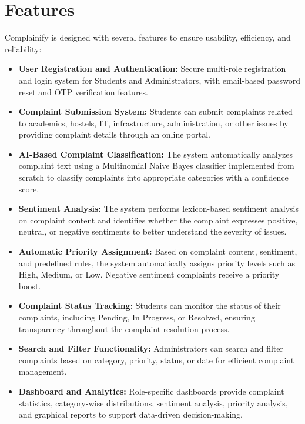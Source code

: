 \documentclass[12pt,a4paper]{report}
\begin{document}
\section{Features}
Complainify is designed with several features to ensure usability, efficiency, and reliability:

\begin{itemize}[nolistsep]
    \item \textbf{User Registration and Authentication:} Secure multi-role registration and login system for Students and Administrators, with email-based password reset and OTP verification features.
    
    \item \textbf{Complaint Submission System:} Students can submit complaints related to academics, hostels, IT, infrastructure, administration, or other issues by providing complaint details through an online portal.
    
    \item \textbf{AI-Based Complaint Classification:} The system automatically analyzes complaint text using a Multinomial Naive Bayes classifier implemented from scratch to classify complaints into appropriate categories with a confidence score.
    
    \item \textbf{Sentiment Analysis:} The system performs lexicon-based sentiment analysis on complaint content and identifies whether the complaint expresses positive, neutral, or negative sentiments to better understand the severity of issues.
    
    \item \textbf{Automatic Priority Assignment:} Based on complaint content, sentiment, and predefined rules, the system automatically assigns priority levels such as High, Medium, or Low. Negative sentiment complaints receive a priority boost.
    
    \item \textbf{Complaint Status Tracking:} Students can monitor the status of their complaints, including Pending, In Progress, or Resolved, ensuring transparency throughout the complaint resolution process.
    
    \item \textbf{Search and Filter Functionality:} Administrators can search and filter complaints based on category, priority, status, or date for efficient complaint management.
    
    \item \textbf{Dashboard and Analytics:} Role-specific dashboards provide complaint statistics, category-wise distributions, sentiment analysis, priority analysis, and graphical reports to support data-driven decision-making.
    

\end{itemize}
\end{document}

